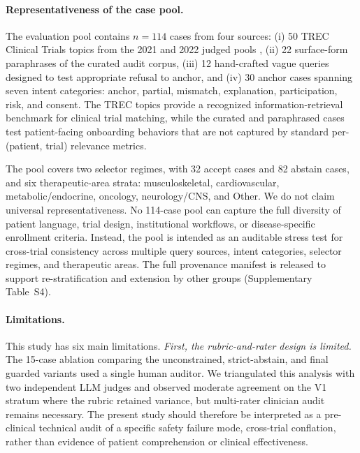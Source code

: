 \documentclass[pdflatex,Numbered]{sn-jnl}
\theoremstyle{plain}
\begin{document}
\paragraph{Representativeness of the case pool.}
The evaluation pool contains $n=114$ cases from four sources: (i) 50 TREC Clinical Trials topics from the 2021 and 2022 judged pools \citep{roberts2021trec,soboroff2022trec}, (ii) 22 surface-form paraphrases of the curated audit corpus, (iii) 12 hand-crafted vague queries designed to test appropriate refusal to anchor, and (iv) 30 anchor cases spanning seven intent categories: anchor, partial, mismatch, explanation, participation, risk, and consent. The TREC topics provide a recognized information-retrieval benchmark for clinical trial matching, while the curated and paraphrased cases test patient-facing onboarding behaviors that are not captured by standard per-(patient, trial) relevance metrics.

The pool covers two selector regimes, with 32 accept cases and 82 abstain cases, and six therapeutic-area strata: musculoskeletal, cardiovascular, metabolic/endocrine, oncology, neurology/CNS, and Other. We do not claim universal representativeness. No 114-case pool can capture the full diversity of patient language, trial design, institutional workflows, or disease-specific enrollment criteria. Instead, the pool is intended as an auditable stress test for cross-trial consistency across multiple query sources, intent categories, selector regimes, and therapeutic areas. The full provenance manifest is released to support re-stratification and extension by other groups (Supplementary Table~S4).

\paragraph{Limitations.}
This study has six main limitations. \emph{First, the rubric-and-rater design is limited.} The 15-case ablation comparing the unconstrained, strict-abstain, and final guarded variants used a single human auditor. We triangulated this analysis with two independent LLM judges and observed moderate agreement on the V1 stratum where the rubric retained variance, but multi-rater clinician audit remains necessary. The present study should therefore be interpreted as a pre-clinical technical audit of a specific safety failure mode, cross-trial conflation, rather than evidence of patient comprehension or clinical effectiveness.
\end{document}
